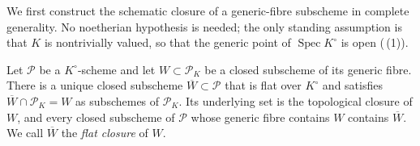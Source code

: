 We first construct the schematic closure of a generic-fibre subscheme in
complete generality.  No noetherian hypothesis is needed; the only standing
assumption is that $K$ is nontrivially valued, so that the generic point of
$\operatorname{Spec}K^\circ$ is open
(\,(1)).

\begin{lemma}
\label{lem:flat-closure-generic-fibre}
Let $\mathcal P$ be a $K^\circ$-scheme and let $W\subset\mathcal P_K$ be a
closed subscheme of its generic fibre.  There is a unique closed subscheme
$\overline W\subset\mathcal P$ that is flat over $K^\circ$ and satisfies
$\overline W\cap\mathcal P_K=W$ as subschemes of $\mathcal P_K$.  Its
underlying set is the topological closure of $W$, and every closed
subscheme of $\mathcal P$ whose generic fibre contains $W$ contains
$\overline W$.  We call $\overline W$ the \emph{flat closure} of $W$.
\end{lemma}
